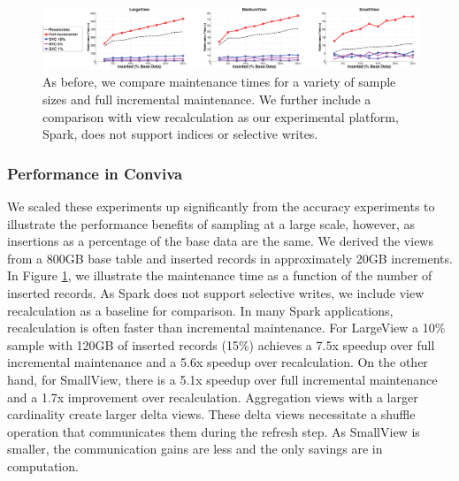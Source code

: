 \begin{figure}[ht] \vspace{-0.75em}
\hspace{-1em}
\vspace{-0.75em}
\includegraphics[scale=0.21]{exp/exp5-efficiency-conviva.eps}
 \caption{As before, we compare maintenance times for a variety of sample sizes and full incremental maintenance. We further include a comparison with view recalculation as our experimental platform, Spark, does not support indices or selective writes.\label{exp6conviva}} \vspace{-1em}
\end{figure}

\subsubsection{Performance in Conviva}
We scaled these experiments up significantly from the accuracy experiments to illustrate the performance benefits of sampling at a large scale, however, as insertions as a percentage of the base data are the same.
We derived the views from a 800GB base table and inserted records in approximately 20GB increments. 
In Figure \ref{exp6conviva}, we illustrate the maintenance time as a function of the number of inserted records.
As Spark does not support selective writes, we include view recalculation as a baseline for comparison.
In many Spark applications, recalculation is often faster than incremental maintenance.
For LargeView a 10\% sample with 120GB of inserted records (15\%) achieves a  7.5x speedup over full incremental maintenance and a 5.6x speedup over recalculation.
On the other hand, for SmallView, there is a 5.1x speedup over full incremental maintenance and a 1.7x improvement over recalculation.
Aggregation views with a larger cardinality create larger delta views.
These delta views necessitate a shuffle operation that communicates them during the refresh step.
As SmallView is smaller, the communication gains are less and the only savings are in computation.



